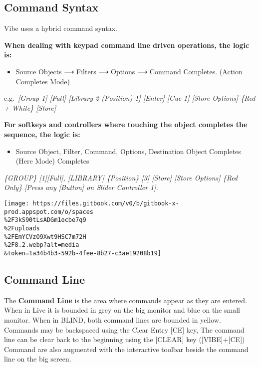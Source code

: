 \documentclass[
]{article}
\providecommand{\tightlist}{%
  \setlength{\itemsep}{0pt}\setlength{\parskip}{0pt}}
\begin{document}
\hypertarget{command-syntax}{%
\subsection{Command Syntax}\label{command-syntax}}

Vibe uses a hybrid command syntax.

\textbf{When dealing with keypad command line driven operations, the logic is:}

\begin{itemize}
\tightlist
\item
  Source Objects ⟶ Filters ⟶ Options ⟶ Command Completes. (Action Completes Mode)
\end{itemize}

e.g.~\emph{{[}Group 1{]} {[}Full{]} {[}Library 2 (Position) 1{]} {[}Enter{]} {[}Cue 1{]} {[}Store Options{]} \{Red + White\} {[}Store{]}}

\textbf{For softkeys and controllers where touching the object completes the sequence, the logic is:}

\begin{itemize}
\tightlist
\item
  Source Object, Filter, Command, Options, Destination Object Completes (Here Mode) Completes
\end{itemize}

\emph{\{GROUP\} {[}1{]}{[}Full{]}, {[}LIBRARY{]} \{Position\} {[}3{]} {[}Store{]} {[}Store Options{]} \{Red Only\} {[}Press any {[}Button{]} on Slider Controller 1{]}.}

\texttt{[image: https://files.gitbook.com/v0/b/gitbook-x-prod.appspot.com/o/spaces\\\%2F3kS90tLsADGm1ocbe7q9\\\%2Fuploads\\\%2FEmYCVzO9Xwt9HSC7m72H\\\%2F8.2.webp?alt=media\\\&token=1a34b4b3-592b-4fee-8b27-c3ae19208b19]}

\hypertarget{command-line}{%
\subsection{Command Line}\label{command-line}}

The \textbf{Command Line} is the area where commands appear as they are entered. When in Live it is bounded in grey on the big monitor and blue on the small monitor. When in BLIND, both command lines are bounded in yellow. Commands may be backspaced using the Clear Entry {[}CE{]} key, The command line can be clear back to the beginning using the {[}CLEAR{]} key ({[}VIBE{]}+{[}CE{]}) Command are also augmented with the interactive toolbar beside the command line on the big screen.
\end{document}
